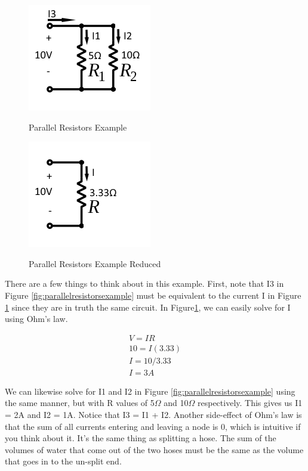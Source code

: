 \begin{figure}
\centering
\begin{minipage}{.5\textwidth}
\centering
\includegraphics[scale=0.75]{parallelresistorsexample.png}
\label{fig:parallelresistorsexample}
\caption{Parallel Resistors Example}
\end{minipage}%
\begin{minipage}{.5\textwidth}
\centering
\includegraphics[scale=0.75]{parallelresistorsexamplemerged.png}
\label{fig:parallelresistorsexamplemerged}
\caption{Parallel Resistors Example Reduced}
\end{minipage}
\end{figure}

There are a few things to think about in this example. First, note that I3 in Figure \ref{fig:parallelresistorsexample} must be equivalent to the current I in Figure \ref{fig:parallelresistorsexamplemerged} since they are in truth the same circuit. In Figure\ref{fig:parallelresistorsexamplemerged}, we can easily solve for I using Ohm's law.

\begin{equation} \label{eqn:solvefori}
\begin{split}
V = IR \\
10 = I(3.33)\\
I = 10/3.33 \\
I = 3A
\end{split}
\end{equation}


We can likewise solve for I1 and I2 in Figure \ref{fig:parallelresistorsexample} using the same manner, but with R values of 5$\Omega$ and 10$\Omega$ respectively. This gives us I1 = 2A and I2 = 1A. Notice that I3 = I1 + I2. Another side-effect of Ohm's law is that the sum of all currents entering and leaving a node is 0, which is intuitive if you think about it. It's the same thing as splitting a hose. The sum of the volumes of water that come out of the two hoses must be the same as the volume that goes in to the un-split end.

